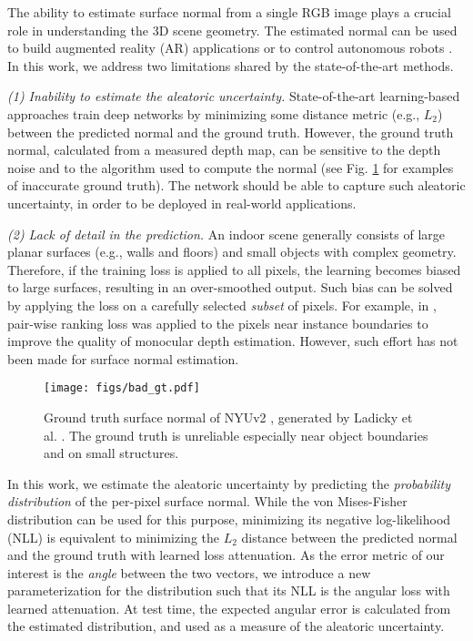 \documentclass[10pt,twocolumn,letterpaper]{article}
\begin{document}
The ability to estimate surface normal from a single RGB image plays a crucial role in understanding the 3D scene geometry. The estimated normal can be used to build augmented reality (AR) applications \cite{SNfromRGB_19_FrameNet} or to control autonomous robots \cite{SN_robot2}. In this work, we address two limitations shared by the state-of-the-art methods.

\textit{(1) Inability to estimate the aleatoric uncertainty.} State-of-the-art learning-based approaches \cite{SNfromRGB_15_Deep3D,SNfromRGB_15_Eigen,SNfromRGB_16_SkipNet,SNfromRGB_18_GeoNet,SNfromRGB_19_FloorsAreFlat,SNfromRGB_19_FrameNet,SNfromRGB_19_PAP,SNfromRGB_19_SR,SNfromRGB_20_GeoNet++,SNfromRGB_20_TiltedSN,SNfromRGB_20_VPLNet} train deep networks by minimizing some distance metric (e.g., $L_2$) between the predicted normal and the ground truth. However, the ground truth normal, calculated from a measured depth map, can be sensitive to the depth noise and to the algorithm used to compute the normal (see Fig. \ref{fig:motivation} for examples of inaccurate ground truth). The network should be able to capture such aleatoric uncertainty, in order to be deployed in real-world applications.

\textit{(2) Lack of detail in the prediction.} An indoor scene generally consists of large planar surfaces (e.g., walls and floors) and small objects with complex geometry. Therefore, if the training loss is applied to all pixels, the learning becomes biased to large surfaces, resulting in an over-smoothed output. Such bias can be solved by applying the loss on a carefully selected \textit{subset} of pixels. For example, in \cite{ranking_loss_depth}, pair-wise ranking loss was applied to the pixels near instance boundaries to improve the quality of monocular depth estimation. However, such effort has not been made for surface normal estimation.

\begin{figure}[t]
\begin{center}
\texttt{[image: figs/bad\_gt.pdf]}
\end{center}
\caption{Ground truth surface normal of NYUv2 \cite{NYUv2}, generated by Ladicky et al. \cite{SNfromRGB_14_Ladicky}. The ground truth is unreliable especially near object boundaries and on small structures.}
\label{fig:motivation}
\end{figure}

In this work, we estimate the aleatoric uncertainty by predicting the \textit{probability distribution} of the per-pixel surface normal. While the von Mises-Fisher distribution \cite{fisher1993statistical} can be used for this purpose, minimizing its negative log-likelihood (NLL) is equivalent to minimizing the $L_2$ distance between the predicted normal and the ground truth with learned loss attenuation. As the error metric of our interest is the \textit{angle} between the two vectors, we introduce a new parameterization for the distribution such that its NLL is the angular loss with learned attenuation. At test time, the expected angular error is calculated from the estimated distribution, and used as a measure of the aleatoric uncertainty.
\end{document}
